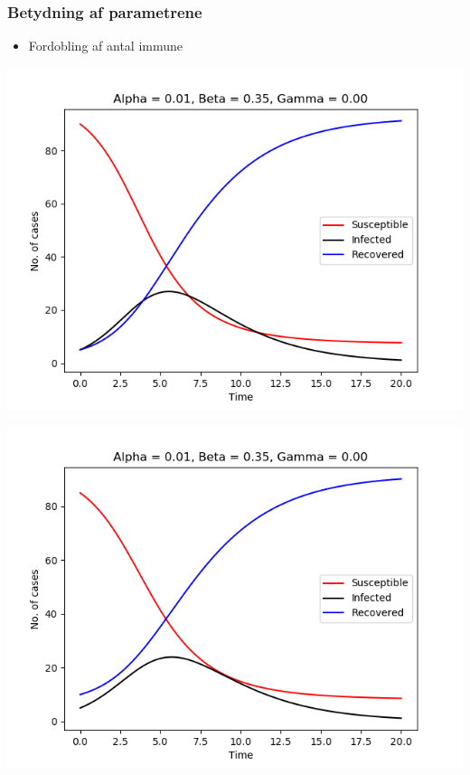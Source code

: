%
\begin{frame}
\frametitle{Betydning af parametrene}
\begin{itemize}
\item Fordobling af antal immune
\end{itemize}

\begin{minipage}{0.49\textwidth}
\includegraphics[scale=0.3]{fig/img/t_a1_b35_g0.png}
\end{minipage}
%
\begin{minipage}{0.49\textwidth}
\includegraphics[scale=0.3]{fig/img/t_x1_5_x2_85.png}
\end{minipage}
\end{frame}
